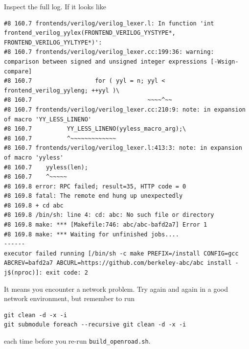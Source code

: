 \documentclass[a4paper,12pt,twoside]{article}
\begin{document}
Inspect the full log. If it looks like
\begin{verbatim}
#8 160.7 frontends/verilog/verilog_lexer.l: In function 'int frontend_verilog_yylex(FRONTEND_VERILOG_YYSTYPE*, FRONTEND_VERILOG_YYLTYPE*)':
#8 160.7 frontends/verilog/verilog_lexer.cc:199:36: warning: comparison between signed and unsigned integer expressions [-Wsign-compare]
#8 160.7                  for ( yyl = n; yyl < frontend_verilog_yyleng; ++yyl )\
#8 160.7                                 ~~~~^~~
#8 160.7 frontends/verilog/verilog_lexer.cc:210:9: note: in expansion of macro 'YY_LESS_LINENO'
#8 160.7          YY_LESS_LINENO(yyless_macro_arg);\
#8 160.7          ^~~~~~~~~~~~~~
#8 160.7 frontends/verilog/verilog_lexer.l:413:3: note: in expansion of macro 'yyless'
#8 160.7    yyless(len);
#8 160.7    ^~~~~~
#8 169.8 error: RPC failed; result=35, HTTP code = 0
#8 169.8 fatal: The remote end hung up unexpectedly
#8 169.8 + cd abc
#8 169.8 /bin/sh: line 4: cd: abc: No such file or directory
#8 169.8 make: *** [Makefile:746: abc/abc-bafd2a7] Error 1
#8 169.8 make: *** Waiting for unfinished jobs....
------
executor failed running [/bin/sh -c make PREFIX=/install CONFIG=gcc ABCREV=bafd2a7 ABCURL=https://github.com/berkeley-abc/abc install -j$(nproc)]: exit code: 2
\end{verbatim}
It means you encounter a network problem. Try again and again in a good network environment, but remember to run
\begin{verbatim}
git clean -d -x -i
git submodule foreach --recursive git clean -d -x -i
\end{verbatim}
each time before you re-run \texttt{build\_openroad.sh}.
\end{document}
